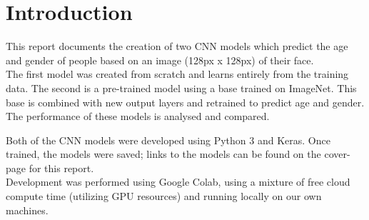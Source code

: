 \section{Introduction}
This report documents the creation of two CNN models which predict the age and gender of people based on an image (128px x 128px) of their face.\\
The first model was created from scratch and learns entirely from the training data. The second is a pre-trained model using a base trained on ImageNet. This base is combined with new output layers and retrained to predict age and gender.\\
The performance of these models is analysed and compared.

Both of the CNN models were developed using Python 3 and Keras. Once trained, the models were saved; links to the models can be found on the cover-page for this report.\\
Development was performed using Google Colab, using a mixture of free cloud compute time (utilizing GPU resources) and running locally on our own machines. 

    
